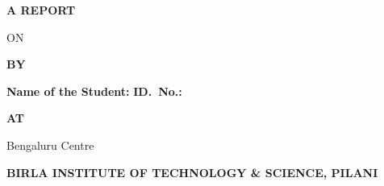 \thispagestyle{empty}
\begin{center}
\vspace*{0.6in}
{\LARGE\bfseries A REPORT}\par
\vspace{18pt}
{\large ON}\par
\vspace{24pt}
\parbox{5.6in}{\centering\Large\bfseries{} \reporttitle\par}\par
\vspace{50pt}
{\LARGE\bfseries BY}\par
\vspace{22pt}
{\large\bfseries Name of the Student:} {\large \student} \hspace{2em}
{\large\bfseries ID.\ No.:} {\large \studentid}\par
\vspace{60pt}
{\LARGE\bfseries AT}\par
\vspace{20pt}
{\large Bengaluru Centre}\par
\vspace{6pt}
{\large \org}\par
{\large \orgloc}\par
\vfill
{\large\bfseries BIRLA INSTITUTE OF TECHNOLOGY \& SCIENCE, PILANI}\par
\vspace{6pt}
{\large \submdate}\par
\end{center}
\cleardoublepage
